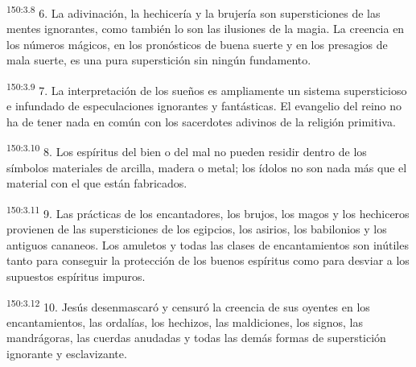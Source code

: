 \par
\textsuperscript{150:3.8} 6. La adivinación, la hechicería y la brujería son supersticiones de las mentes ignorantes, como también lo son las ilusiones de la magia. La creencia en los números mágicos, en los pronósticos de buena suerte y en los presagios de mala suerte, es una pura superstición sin ningún fundamento.

\par
\textsuperscript{150:3.9} 7. La interpretación de los sueños es ampliamente un sistema supersticioso e infundado de especulaciones ignorantes y fantásticas. El evangelio del reino no ha de tener nada en común con los sacerdotes adivinos de la religión primitiva.

\par
\textsuperscript{150:3.10} 8. Los espíritus del bien o del mal no pueden residir dentro de los símbolos materiales de arcilla, madera o metal; los ídolos no son nada más que el material con el que están fabricados.

\par
\textsuperscript{150:3.11} 9. Las prácticas de los encantadores, los brujos, los magos y los hechiceros provienen de las supersticiones de los egipcios, los asirios, los babilonios y los antiguos cananeos. Los amuletos y todas las clases de encantamientos son inútiles tanto para conseguir la protección de los buenos espíritus como para desviar a los supuestos espíritus impuros.

\par
\textsuperscript{150:3.12} 10. Jesús desenmascaró y censuró la creencia de sus oyentes en los encantamientos, las ordalías, los hechizos, las maldiciones, los signos, las mandrágoras, las cuerdas anudadas y todas las demás formas de superstición ignorante y esclavizante.

